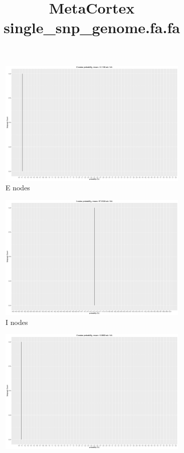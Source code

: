 \documentclass[a4paper, 12pt, oneside]{article}
\title{\large{MetaCortex single_snp_genome.fa.fa}}
\begin{document}
\maketitle

\begin{figure}[h]
\centering
\begin{subfigure}[b]{0.45\textwidth}
\includegraphics[width=\textwidth]{graphs/E_degrees.png}
\caption{\label{fig:E}E nodes}
\end{subfigure}
\begin{subfigure}[b]{0.45\textwidth}
\includegraphics[width=\textwidth]{graphs/I_degrees.png}
\caption{\label{fig:I}I nodes }
\end{subfigure}
\begin{subfigure}[b]{0.45\textwidth}
\includegraphics[width=\textwidth]{graphs/X_degrees.png}

\end{subfigure}
\end{figure}
\end{document}
